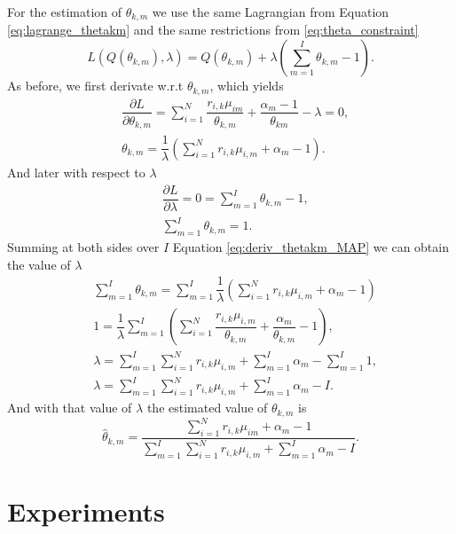 \documentclass[12pt]{article}
\begin{document}
\noindent For the estimation of $\theta_{k,m}$ we use the same Lagrangian from Equation \ref{eq:lagrange_thetakm} and the same restrictions from \ref{eq:theta_constraint} 
\begin{equation}
L\left( Q(\theta_{k,m}),\lambda \right) = Q(\theta_{k,m}) + \lambda \left( \sum \limits_{m=1}^{I} \theta_{k,m} - 1 \right).
\end{equation}
As before, we first derivate w.r.t $\theta_{k,m}$, which yields
\begin{align}
& \dfrac{\partial L}{\partial \theta_{k,m}} = \sum \limits_{i=1}^{N} \dfrac{r_{i,k}\mu_{im}}{\theta_{k,m}} + \dfrac{\alpha_m-1}{\theta_{km}} - \lambda = 0, \\
& \theta_{k,m} = \dfrac{1}{\lambda} \left( \sum \limits_{i=1}^{N} r_{i,k}\mu_{i,m} +\alpha_m - 1\right) \label{eq:deriv_thetakm_MAP}.
\end{align}
And later with respect to $\lambda$
\begin{align}
& \dfrac{\partial L}{\partial \lambda} = 0 = \sum \limits_{m=1}^{I} \theta_{k,m} - 1,\\
& \sum \limits_{m=1}^{I} \theta_{k,m} = 1.
\end{align}
Summing at both sides over $I$ Equation \ref{eq:deriv_thetakm_MAP} we can obtain the value of $\lambda$
\begin{align}
& \sum \limits_{m=1}^{I}\theta_{k,m} = \sum \limits_{m=1}^{I} \dfrac{1}{\lambda} \left( \sum \limits_{i=1}^{N} r_{i,k}\mu_{i,m} + \alpha_m - 1 \right)\\
& 1 = \dfrac{1}{\lambda} \sum \limits_{m=1}^{I} \left( \sum \limits_{i=1}^{N} \dfrac{r_{i,k}\mu_{i,m}}{\theta_{k,m}} + \dfrac{\alpha_m}{\theta_{k,m}} - 1 \right),\\
& \lambda = \sum \limits_{m=1}^{I} \sum \limits_{i=1}^{N} r_{i,k}\mu_{i,m} + \sum \limits_{m=1}^{I} \alpha_m - \sum \limits_{m=1}^{I} 1,\\
& \lambda = \sum \limits_{m=1}^{I} \sum \limits_{i=1}^{N} r_{i,k}\mu_{i,m} + \sum \limits_{m=1}^{I} \alpha_m - I.
\end{align}
And with that value of $\lambda$ the estimated value of $\theta_{k,m}$ is
\begin{equation}
\hat{\theta}_{k,m} = \dfrac{\sum \limits_{i=1}^{N} r_{i,k}\mu_{im} +\alpha_m - 1}{\sum \limits_{m=1}^{I} \sum \limits_{i=1}^{N} r_{i,k}\mu_{i,m} + \sum \limits_{m=1}^{I} \alpha_m - I}.
\end{equation}

\section{Experiments}
\end{document}
